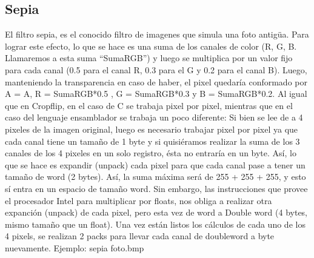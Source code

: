 \documentclass[a4paper]{article}
\begin{document}
\subsection{Sepia}
El filtro sepia, es el conocido filtro de imagenes que simula una foto antigüa. Para lograr este efecto, lo que se hace es una suma
de los canales de color (R, G, B. Llamaremos a esta suma ``SumaRGB'') y luego se multiplica por un valor fijo para cada canal (0.5 para el canal R, 0.3 para el G
y 0.2 para el canal B). Luego, manteniendo la transparencia en caso de haber, el pixel quedaría conformado por A = A, R = SumaRGB*0.5
, G = SumaRGB*0.3 y B = SumaRGB*0.2. \newline
Al igual que en Cropflip, en el caso de C se trabaja pixel por pixel, mientras que en el caso del lenguaje ensamblador se trabaja un poco diferente:
Si bien se lee de a 4 pixeles de la imagen original, luego es necesario trabajar pixel por pixel ya que cada canal tiene un tamaño de 1 byte
y si quisiéramos realizar la suma de los 3 canales de los 4 pixeles en un solo registro, ésta no entraría en un byte. Así, lo que se hace
es expandir (unpack) cada pixel para que cada canal pase a tener un tamaño de word (2 bytes). Así, la suma máxima será de 255 + 255 + 255, y esto sí
entra en un espacio de tamaño word. Sin embargo, las instrucciones que provee el procesador Intel para multiplicar por floats, nos obliga
a realizar otra expanción (unpack) de cada pixel, pero esta vez de word a Double word (4 bytes, mismo tamaño que un float).
Una vez están listos los cálculos de cada uno de los 4 pixels, se realizan 2 packs para llevar cada canal de doubleword a byte nuevamente.
\newline
Ejemplo: sepia foto.bmp
\end{document}
